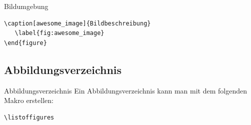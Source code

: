 \begin{frame}[fragile]{Bildumgebung}
\begin{lstlisting}[style=tex]
   \caption[awesome_image]{Bildbeschreibung}
   \label{fig:awesome_image}
\end{figure}\end{lstlisting}
\end{frame}

\subsection{Abbildungsverzeichnis}
\begin{frame}[fragile]{Abbildungsverzeichnis}
Ein Abbildungsverzeichnis kann man mit dem folgenden Makro erstellen:

\begin{lstlisting}[style=tex]
\listoffigures
\end{lstlisting}

\end{frame}